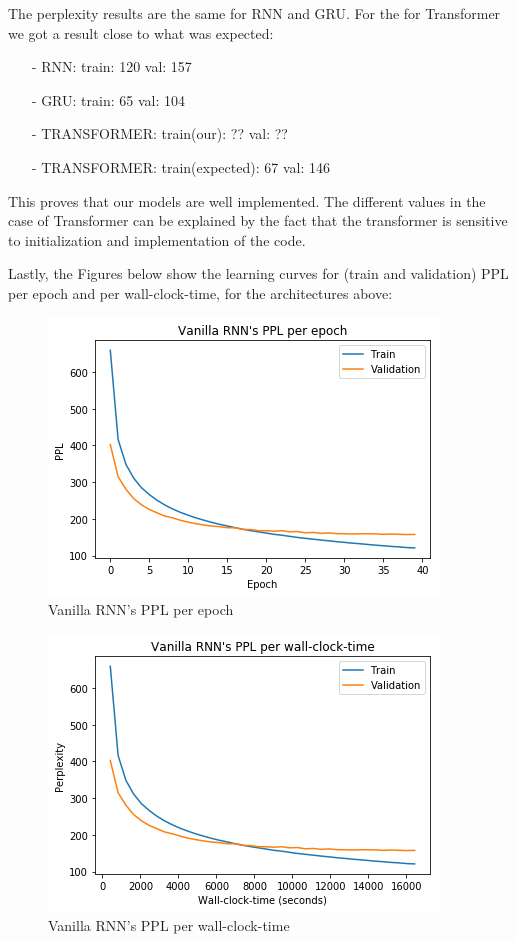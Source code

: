 The perplexity results are the same for RNN and GRU. For the for Transformer we got a result close to what was expected:
\begin{itemize}
	\item[-] RNN: train:  120  val: 157
	\item[-] GRU: train:   65  val: 104
	\item[-] TRANSFORMER:  train(our):  ??  val: ??
	\item[-] TRANSFORMER:  train(expected):  67  val: 146
\end{itemize}

This proves that our models are well implemented. The different values in the case of Transformer can be explained by the fact that the transformer is sensitive to initialization and implementation of the code. 

Lastly, the Figures below show the learning curves for (train and validation) PPL per epoch and per wall-clock-time, for the architectures above:

\begin{figure}[H]
	\centering
	\includegraphics[scale=0.8]{VRNN_LC_EPOCH.png}
	\caption{Vanilla RNN's PPL per epoch}
	\label{fig:fig1}
\end{figure}

\begin{figure}[H]
	\centering
	\includegraphics[scale=0.8]{VRNN_LC_TIME.png}
	\caption{Vanilla RNN's PPL per wall-clock-time}
	\label{fig:fig2}
\end{figure}

